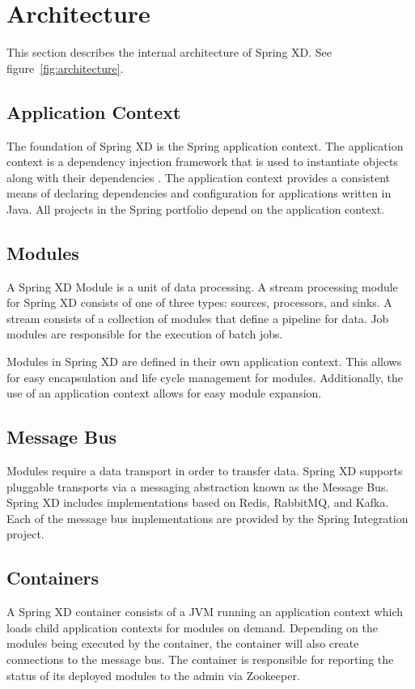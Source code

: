 \section{Architecture}
This section describes the internal architecture of Spring XD. See
figure~\ref{fig:architecture}.

\subsection{Application Context}
The foundation of Spring XD is the Spring application context. The application
context is a dependency injection framework that is used to instantiate
objects along with their dependencies \cite{spring-framework-reference}.
The application context provides a consistent means of declaring dependencies
and configuration for applications written in Java. All projects in the
Spring portfolio depend on the application context.

\subsection{Modules}
A Spring XD Module is a unit of data processing. A stream processing module
for Spring XD consists of one of three types: sources, processors, and sinks.
A stream consists of a collection of modules that define a pipeline for data. 
Job modules are responsible for the execution of batch jobs.

Modules in Spring XD are defined in their own application context. This allows
for easy encapsulation and life cycle management for modules. Additionally,
the use of an application context allows for easy module expansion.

\subsection{Message Bus}
Modules require a data transport in order to transfer data. Spring XD
supports pluggable transports via a messaging abstraction known as 
the Message Bus. Spring XD includes implementations based on Redis, RabbitMQ,
and Kafka. Each of the message bus implementations are provided by the
Spring Integration project.

\subsection{Containers}
A Spring XD container consists of a JVM running an application context which
loads child application contexts for modules on demand. Depending on the modules
being executed by the container, the container will also create connections to
the message bus. The container is responsible for reporting the status of its deployed 
modules to the admin via Zookeeper.  

